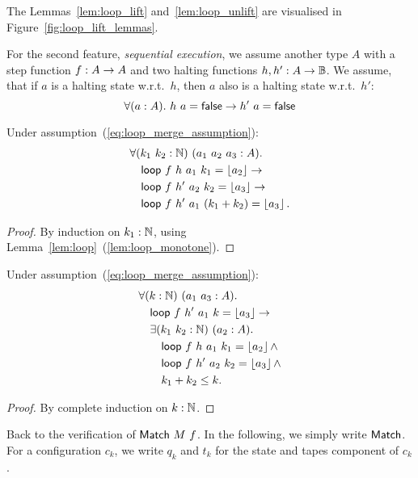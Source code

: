 The Lemmas~\ref{lem:loop_lift} and~\ref{lem:loop_unlift} are visualised in Figure~\ref{fig:loop_lift_lemmas}.

For the second feature, \textit{sequential execution}, we assume another type $A$ with a step function $f : A \rightarrow A$ and two halting functions
$h, h' : A \rightarrow \mathbb{B}$.  We assume, that if $a$ is a halting state w.r.t.\ $h$, then $a$ also is a halting state w.r.t.\ $h'$:
\begin{equation}
  \label{eq:loop_merge_assumption}
  \forall(a:A).~h~a = \mathsf{false} \rightarrow h'~a = \mathsf{false}
\end{equation}

\begin{lemma}
  \label{lem:loop_merge}
  Under assumption~(\ref{eq:loop_merge_assumption}):
  \begin{align*}
    & \forall (k_1~k_2:\mathbb{N})~(a_1~a_2~a_3 : A).\\
    & \quad \mathsf{loop}~f~h ~a_1~k_1       = \left\lfloor {a_2} \right\rfloor \rightarrow\\
    & \quad \mathsf{loop}~f~h'~a_2~k_2       = \left\lfloor {a_3} \right\rfloor \rightarrow\\
    & \quad \mathsf{loop}~f~h'~a_1~(k_1+k_2) = \left\lfloor {a_3} \right\rfloor.
  \end{align*}
\end{lemma}
\begin{proof}
  By induction on $k_1:\mathbb{N}$, using Lemma~\ref{lem:loop}~(\ref{lem:loop_monotone}).
\end{proof}
\begin{lemma}
  \label{lem:loop_split}
  Under assumption~(\ref{eq:loop_merge_assumption}):
  \begin{align*}
    & \forall (k:\mathbb{N})~(a_1~a_3 : A).\\
    & \quad \mathsf{loop}~f~h'~a_1~k = \left\lfloor {a_3} \right\rfloor \rightarrow \\
    & \quad \exists (k_1~k_2:\mathbb{N})~(a_2:A).\\
    & \quad \quad \mathsf{loop}~f~h ~a_1~k_1 = \left\lfloor {a_2} \right\rfloor \land\\
    & \quad \quad \mathsf{loop}~f~h'~a_2~k_2 = \left\lfloor {a_3} \right\rfloor \land\\
    & \quad \quad k_1 + k_2 \leq k.
  \end{align*}
\end{lemma}
\begin{proof}
  By complete induction on $k:\mathbb{N}$.
\end{proof}


Back to the verification of $\mathsf{Match}~M~f$.  In the following, we simply write $\mathsf{Match}$.  For a configuration $c_k$, we write $q_k$ and $t_k$ for the
state and tapes component of $c_k$.

